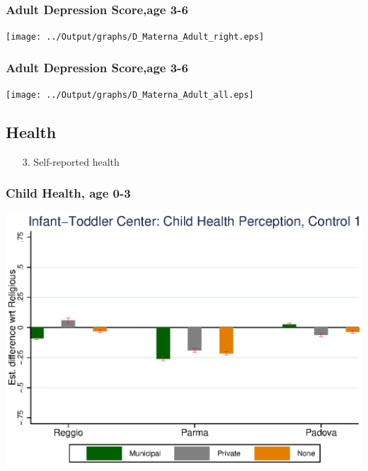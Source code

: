 \documentclass{beamer}
\begin{document}
\begin{frame}\frametitle{Adult Depression Score,age 3-6}
\center
\texttt{[image: ../Output/graphs/D\_Materna\_Adult\_right.eps]}
\end{frame}

\begin{frame}\frametitle{Adult Depression Score,age 3-6}
\center
\texttt{[image: ../Output/graphs/D\_Materna\_Adult\_all.eps]}
\end{frame}



\subsection{Health}
\begin{frame}
\begin{itemize}
	\centering
	\item[3.] Self-reported health
\end{itemize}
\end{frame}

\begin{frame}\frametitle{Child Health, age 0-3}
\center
\includegraphics[scale=0.7]{../Output/graphs/CH_Asilo_Child_main.eps}
\end{frame}
\end{document}
